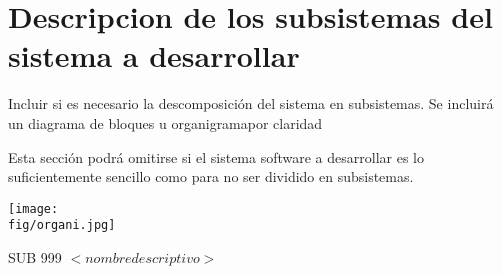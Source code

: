 \section{Descripcion de los subsistemas del sistema a desarrollar} 
\begin{textoazul}
Incluir si es necesario la descomposición del sistema en subsistemas. Se incluirá un diagrama de bloques u organigramapor claridad

Esta sección podrá omitirse si el sistema software a desarrollar es lo suficientemente sencillo como para no ser dividido en subsistemas.
\end{textoazul}


 \begin{Artefacto}[H]
 \centering
\texttt{[image: \\fig/organi.jpg]}
 \caption{SUB 999	$<nombre descriptivo>$}
 \end{Artefacto}


